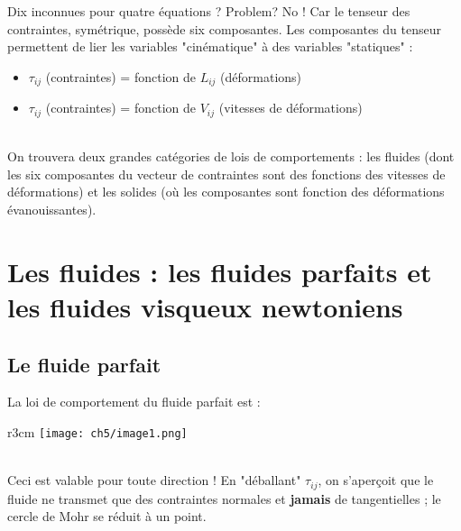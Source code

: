 Dix inconnues pour quatre équations ? Problem? No ! Car le tenseur des contraintes, symétrique,
possède six composantes. Les composantes du tenseur permettent de lier les variables "cinématique" à des variables "statiques" :
\begin{itemize}
	\item $\tau_{ij}$ (contraintes) = fonction de $L_{ij}$ (déformations)
	\item $\tau_{ij}$ (contraintes) = fonction de $V_{ij}$ (vitesses de déformations)
\end{itemize}\ \\

On trouvera deux grandes catégories de lois de comportements : les fluides (dont les six composantes 
du vecteur de contraintes sont des fonctions des vitesses de déformations) et les solides (où 
les composantes sont fonction des déformations évanouissantes).

\section{Les fluides : les fluides parfaits et les fluides visqueux newtoniens}
\subsection{Le fluide parfait}
La loi de comportement du fluide parfait est : \\
\begin{wrapfigure}[2]{r}{3cm}
	\texttt{[image: ch5/image1.png]}
\end{wrapfigure}
        
\ \\
    
Ceci est valable pour toute direction ! En "déballant" $\tau_{ij}$, on s'aperçoit que le
fluide ne transmet que des contraintes normales et \textbf{jamais} de tangentielles ; le
cercle de Mohr se réduit à un point.
    
